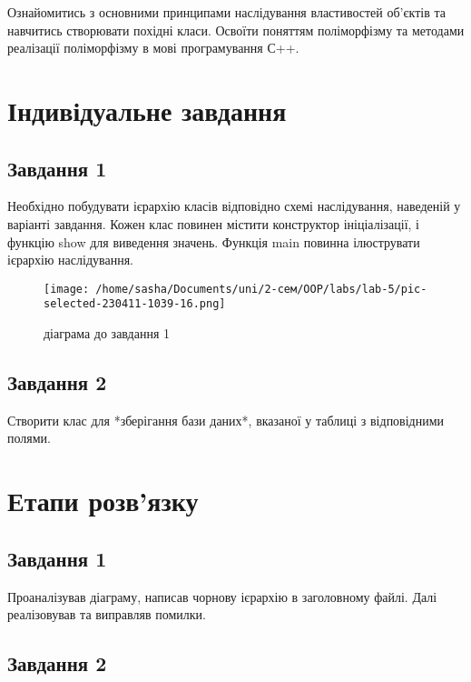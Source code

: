 \documentclass[a4paper, 12pt, oneside]{extarticle}
\begin{document}
\Margins



Ознайомитись з основними принципами наслідування властивостей
об’єктів
та
навчитись
створювати
похідні
класи.
Освоїти
поняттям
поліморфізму та методами реалізації поліморфізму в мові програмування С++.

\section*{Індивідуальне завдання}

\subsection*{Завдання 1}

Необхідно побудувати ієрархію класів відповідно схемі наслідування,
наведеній у варіанті завдання.
Кожен клас повинен містити конструктор
ініціалізації, і функцію show для виведення значень.
Функція main повинна
ілюструвати ієрархію наслідування.

\begin{figure}[h]
	\centering
	\texttt{[image: /home/sasha/Documents/uni/2-сем/OOP/labs/lab-5/pic-selected-230411-1039-16.png]}
	\caption{діаграма до завдання 1}
\end{figure}

\subsection*{Завдання 2}

Створити клас для *зберігання бази даних*, вказаної у таблиці з
відповідними полями.

\section*{Етапи розв'язку}

\subsection*{Завдання 1}
Проаналізував діаграму, написав чорнову ієрархію в заголовному файлі.
Далі реалізовував та виправляв помилки.

\subsection*{Завдання 2}
\end{document}

